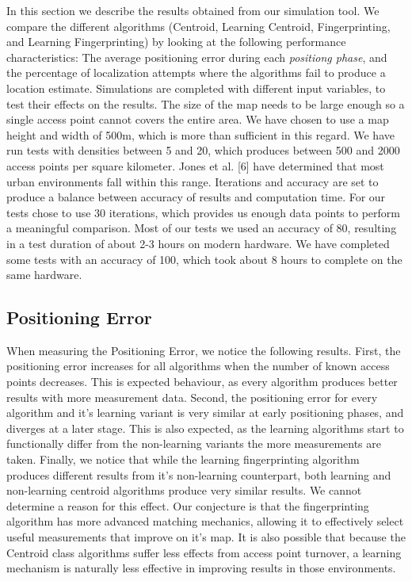 \documentclass{sig-alternate-br}
\begin{document}
In this section we describe the results obtained from our simulation tool. We compare the different algorithms (Centroid, Learning Centroid, Fingerprinting, and Learning Fingerprinting) by looking at the following performance characteristics: The average positioning error during each \textit{positiong phase}, and the percentage of localization attempts where the algorithms fail to produce a location estimate. Simulations are completed with different input variables, to test their effects on the results. The size of the map needs to be large enough so a single access point cannot covers the entire area. We have chosen to use a map height and width of 500m, which is more than sufficient in this regard. We have run tests with densities between 5 and 20, which produces between 500 and 2000 access points per square kilometer. Jones et al. [6] have determined that most urban environments fall within this range. Iterations and accuracy are set to produce a balance between accuracy of results and computation time. For our tests chose to use 30 iterations, which provides us enough data points to perform a meaningful comparison. Most of our tests we used an accuracy of 80, resulting in a test duration of about 2-3 hours on modern hardware. We have completed some tests with an accuracy of 100, which took about 8 hours to complete on the same hardware.

\subsection{Positioning Error}
When measuring the Positioning Error, we notice the following results. First, the positioning error increases for all algorithms when the number of known access points decreases. This is expected behaviour, as every algorithm produces better results with more measurement data. Second, the positioning error for every algorithm and it's learning variant is very similar at early positioning phases, and diverges at a later stage. This is also expected, as the learning algorithms start to functionally differ from the non-learning variants the more measurements are taken. Finally, we notice that while the learning fingerprinting algorithm produces different results from it's non-learning counterpart, both learning and non-learning centroid algorithms produce very similar results. We cannot determine a reason for this effect. Our conjecture is that the fingerprinting algorithm has more advanced matching mechanics, allowing it to effectively select useful measurements that improve on it's map. It is also possible that because the Centroid class algorithms suffer less effects from access point turnover, a learning mechanism is naturally less effective in improving results in those environments.
\end{document}
